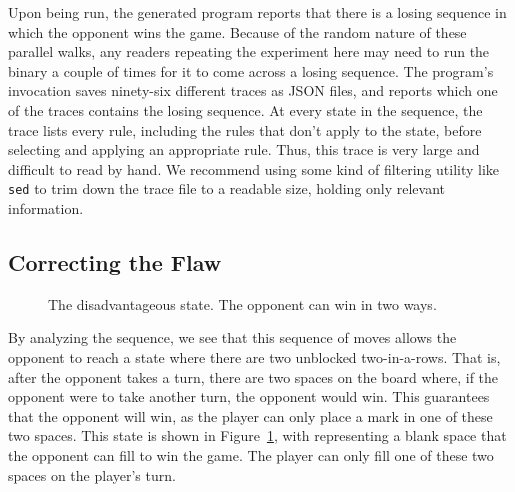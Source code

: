 Upon being run, the generated program reports that there is a losing sequence
in which the opponent wins the game.
Because of the random nature of these parallel walks, any readers repeating the
experiment here may need to run the binary a couple of times for it to come
across a losing sequence.
The program's invocation saves ninety-six different traces as JSON files,
and reports which one of the traces contains the losing sequence.
At every state in the sequence, the trace lists every rule, including
the rules that don't apply to the state, before selecting and applying an
appropriate rule.
Thus, this trace is very large and difficult to read by hand.
We recommend using some kind of filtering utility like \texttt{sed} to trim
down the trace file to a readable size, holding only relevant information.

\subsection{Correcting the Flaw}\label{subsec:correcting-the-flaw}

\begin{figure}
    \begin{center}
    \end{center}
    \caption{The disadvantageous state. The opponent can win in two ways.}
    \label{fig:ttt-trouble-state}
\end{figure}

By analyzing the sequence, we see that this sequence of moves allows the
opponent to reach a state where there are two unblocked two-in-a-rows.
That is, after the opponent takes a turn, there are two spaces on the board
where, if the opponent were to take another turn, the opponent would win.
This guarantees that the opponent will win, as the player can only place a mark
in one of these two spaces.
This state is shown in Figure~\ref{fig:ttt-trouble-state},
with \tictactoeletter{\#} representing a blank space that the opponent can
fill to win the game.
The player can only fill one of these two spaces on the player's turn.

